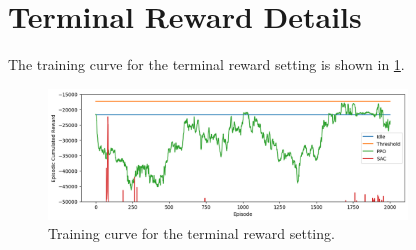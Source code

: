 \section{Terminal Reward Details} \label{sec:terminal_reward_details}
The training curve for the terminal reward setting is shown in \cref{fig:training_curve_terminal}. 
\begin{figure}[H]
    \centering
    \includegraphics[width=0.85\textwidth]{figures/training_curve_terminal.png}
    \caption{Training curve for the terminal reward setting.}
    \label{fig:training_curve_terminal}
\end{figure}